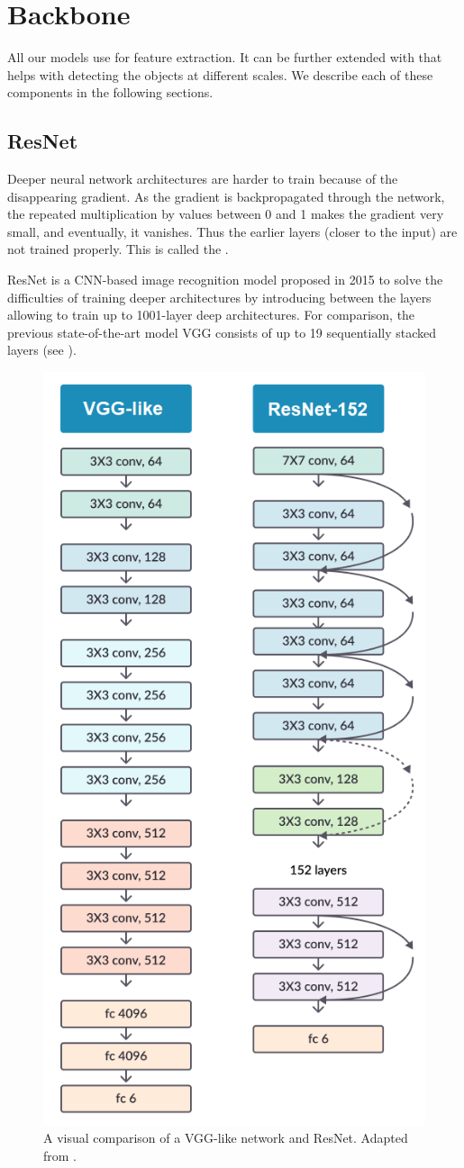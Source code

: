 \section{Backbone}
All our models use  \cite{resnet} for feature extraction. It
can be further extended with  \cite{fpn}
that helps with detecting the objects at different scales. We describe each
of these components in the following sections.

\subsection{ResNet}
Deeper neural network architectures are harder to train because of the
disappearing gradient. As the gradient is backpropagated through the network,
the repeated multiplication by values between 0 and 1 makes the gradient
very small, and eventually, it vanishes. Thus the earlier layers (closer
to the input) are not trained properly. This is called the .

ResNet is a CNN-based image recognition model proposed in 2015 \cite{resnet}
to solve the difficulties of training deeper architectures by introducing
 between the layers allowing to train up to 1001-layer
deep architectures. For comparison, the previous state-of-the-art model
VGG \cite{vgg} consists of up to 19 sequentially stacked layers (see
).

\begin{figure}[h]
    \centering
    \includegraphics[width=0.5\linewidth]{Sources/Figures/vgg_resnet.png}
    \caption{A visual comparison of a VGG-like network and ResNet. Adapted from
        \cite{resnet}.}
    \label{fig:vgg_resnet}
\end{figure}

